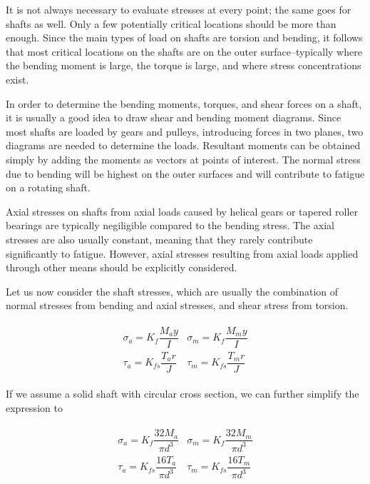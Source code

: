 \documentclass[
10pt,
a4paper,
openany,
svgnames,
]{book}
\begin{document}
It is not always necessary to evaluate stresses at every point; the same goes for shafts as well. Only a few potentially critical locations should be more than enough. Since the main types of load on shafts are torsion and bending, it follows that most critical locations on the shafts are on the outer surface--typically where the bending moment is large, the torque is large, and where stress concentrations exist.

In order to determine the bending moments, torques, and shear forces on a shaft, it is usually a good idea to draw shear and bending moment diagrams. Since most shafts are loaded by gears and pulleys, introducing forces in two planes, two diagrams are needed to determine the loads. Resultant moments can be obtained simply by adding the moments as vectors at points of interest. The normal stress due to bending will be highest on the outer surfaces and will contribute to fatigue on a rotating shaft.

Axial stresses on shafts from axial loads caused by helical gears or tapered roller bearings are typically negiligible compared to the bending stress. The axial stresses are also usually constant, meaning that they rarely contribute significantly to fatigue. However, axial stresses resulting from axial loads applied through other means should be explicitly considered.

Let us now consider the shaft stresses, which are usually the combination of normal stresses from bending and axial stresses, and shear stress from torsion.

\begin{align}
  \label{eq: shaft normal and shear stresses}
  \begin{array}{ll}
    \sigma_a = K_f \dfrac{M_a y}{I} & \sigma_m = K_f \dfrac{M_m y}{I} \\[1em]
    \tau_a = K_{fs} \dfrac{T_a r}{J} & \tau_m = K_{fs} \dfrac{T_m r}{J}
  \end{array}
\end{align}

If we assume a solid shaft with circular cross section, we can further simplify the expression to

\begin{align}
  \label{eq: shaft normal and shear stresses simplify}
  \begin{array}{ll}
    \sigma_a = K_f \dfrac{32M_a}{\pi d^3} & \sigma_m = K_f \dfrac{32M_m}{\pi d^3} \\[1em]
    \tau_a = K_{fs} \dfrac{16T_a}{\pi d^3} & \tau_m = K_{fs} \dfrac{16T_m }{\pi d^3}
  \end{array}
\end{align}
\end{document}
